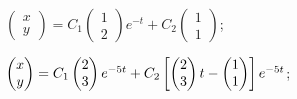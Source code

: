 \begin{enumsolsfull}
		\item \( \begin{pmatrix} x \\ y \end{pmatrix} = C_1 \begin{pmatrix} 1 \\ 2 \end{pmatrix} e^{-t} + C_2 \begin{pmatrix} 1 \\ 1 \end{pmatrix} \); %
		\item \( \begin{pmatrix} x \\ y \end{pmatrix} = C_1 \begin{pmatrix} 2 \\ 3 \end{pmatrix} e^{-5t} + C_2 \left[ \begin{pmatrix} 2 \\ 3 \end{pmatrix}t - \begin{pmatrix} 1 \\ 1 \end{pmatrix} \right] e^{-5t} \); %

\end{enumsolsfull}
